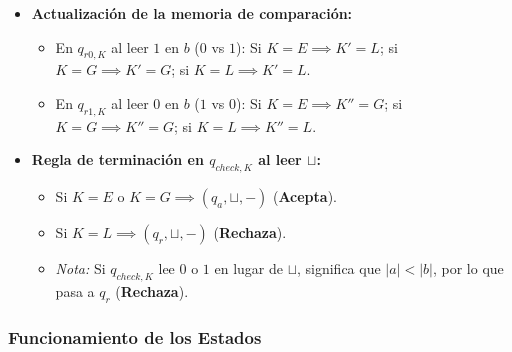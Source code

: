 \begin{itemize}[leftmargin=*]
    \item \textbf{Actualización de la memoria de comparación:}
    \begin{itemize}[leftmargin=*]
        \item En $q_{r0, K}$ al leer $1$ en $b$ ($0$ vs $1$): Si $K=E \implies K'=L$; si $K=G \implies K'=G$; si $K=L \implies K'=L$.
        \item En $q_{r1, K}$ al leer $0$ en $b$ ($1$ vs $0$): Si $K=E \implies K''=G$; si $K=G \implies K''=G$; si $K=L \implies K''=L$.
    \end{itemize}
    \item \textbf{Regla de terminación en $q_{check, K}$ al leer $\sqcup$:}
    \begin{itemize}[leftmargin=*]
        \item Si $K = E$ o $K = G \implies (q_a, \sqcup, -)$ (\textbf{Acepta}).
        \item Si $K = L \implies (q_r, \sqcup, -)$ (\textbf{Rechaza}).
        \item \textit{Nota:} Si $q_{check, K}$ lee $0$ o $1$ en lugar de $\sqcup$, significa que $|a| < |b|$, por lo que pasa a $q_r$ (\textbf{Rechaza}).
    \end{itemize}
\end{itemize}

\subsubsection*{Funcionamiento de los Estados}

